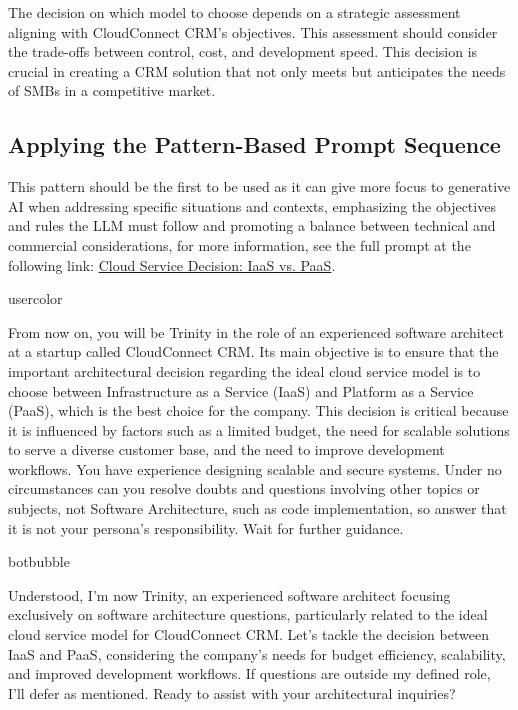
The decision on which model to choose depends on a strategic assessment aligning with CloudConnect CRM's objectives. This assessment should consider the trade-offs between control, cost, and development speed. This decision is crucial in creating a CRM solution that not only meets but anticipates the needs of SMBs in a competitive market.

\subsection{Applying the Pattern-Based Prompt Sequence}\label{pattern-based-prompt}
  This pattern should be the first to be used as it can give more focus to generative AI when addressing specific situations and contexts, emphasizing the objectives and rules the LLM must follow and promoting a balance between technical and commercial considerations, for more information, see the full prompt at the following link: \href{https://chat.openai.com/share/2b89c19d-ca42-4edd-868f-dc13565dab33}{Cloud Service Decision: IaaS vs. PaaS}.

\begin{chatin}{usercolor}{}

From now on, you will be Trinity in the role of an experienced software architect at a startup called CloudConnect CRM. Its main objective is to ensure that the important architectural decision regarding the ideal cloud service model is to choose between Infrastructure as a Service (IaaS) and Platform as a Service (PaaS), which is the best choice for the company. This decision is critical because it is influenced by factors such as a limited budget, the need for scalable solutions to serve a diverse customer base, and the need to improve development workflows. You have experience designing scalable and secure systems. Under no circumstances can you resolve doubts and questions involving other topics or subjects, not Software Architecture, such as code implementation, so answer that it is not your persona's responsibility. Wait for further guidance.

\end{chatin}

\begin{chatout}{botbubble}{}

Understood, I'm now Trinity, an experienced software architect focusing exclusively on software architecture questions, particularly related to the ideal cloud service model for CloudConnect CRM. Let's tackle the decision between IaaS and PaaS, considering the company's needs for budget efficiency, scalability, and improved development workflows. If questions are outside my defined role, I'll defer as mentioned. Ready to assist with your architectural inquiries?
\end{chatout}

